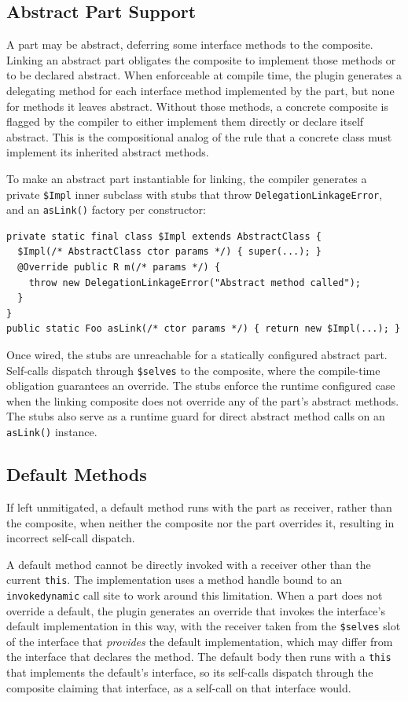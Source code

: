 \documentclass[acmsmall,screen,review,anonymous]{acmart}
\theoremstyle{acmplain}
\newcommand{\code}[1]{\texttt{#1}}
\begin{document}
\subsection{Abstract Part Support}

A part may be abstract, deferring some interface methods to the composite. Linking an abstract part obligates the composite
to implement those methods or to be declared abstract. When enforceable at compile time, the plugin generates a delegating
method for each interface method implemented by the part, but none for methods it leaves abstract. Without those methods, a
concrete composite is flagged by the compiler to either implement them directly or declare itself abstract. This is the
compositional analog of the rule that a concrete class must implement its inherited abstract methods.

To make an abstract part instantiable for linking, the compiler generates a private \code{\$Impl} inner subclass with stubs
that throw \code{DelegationLinkageError}, and an \code{asLink()} factory per constructor:

\begin{lstlisting}
private static final class $Impl extends AbstractClass {
  $Impl(/* AbstractClass ctor params */) { super(...); }
  @Override public R m(/* params */) {
    throw new DelegationLinkageError("Abstract method called");
  }
}
public static Foo asLink(/* ctor params */) { return new $Impl(...); }
\end{lstlisting}

Once wired, the stubs are unreachable for a statically configured abstract part. Self-calls dispatch through \code{\$selves}
to the composite, where the compile-time obligation guarantees an override. The stubs enforce the runtime configured case
when the linking composite does not override any of the part's abstract methods. The stubs also serve as a runtime guard
for direct abstract method calls on an \code{asLink()} instance.

\subsection{Default Methods}
\label{subsec:default}

If left unmitigated, a default method runs with the part as receiver, rather than the composite, when neither the composite
nor the part overrides it, resulting in incorrect self-call dispatch.

A default method cannot be directly invoked with a receiver other than the current \code{this}. The implementation uses a method handle
bound to an \code{invokedynamic} call site to work around this limitation. When a part does not override a default, the plugin
generates an override that invokes the interface's default implementation in this way, with the receiver taken from the
\code{\$selves} slot of the interface that \emph{provides} the default implementation, which may differ from the interface
that declares the method. The default body then runs with a \code{this} that implements the default's interface, so its
self-calls dispatch through the composite claiming that interface, as a self-call on that interface would.
\end{document}
